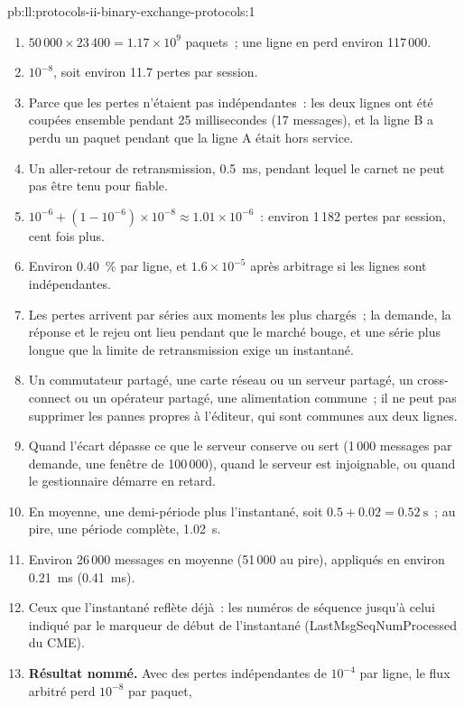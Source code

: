 \begin{solution}{pb:ll:protocols-ii-binary-exchange-protocols:1}
\begin{enumerate}
\item $50\,000 \times 23\,400 = 1.17 \times 10^9$ paquets~; une ligne en perd environ 117\,000.
\item $10^{-8}$, soit environ 11.7 pertes par session.
\item Parce que les pertes n'étaient pas indépendantes~: les deux lignes ont été coupées ensemble pendant 25 millisecondes (17 messages), et la ligne B a perdu un
paquet pendant que la ligne A était hors service.
\item Un aller-retour de retransmission, \qty{0.5}{\milli\second}, pendant lequel le carnet ne peut pas être tenu pour fiable.
\item $10^{-6} + (1 - 10^{-6}) \times 10^{-8} \approx 1.01 \times 10^{-6}$~: environ 1\,182 pertes par session, cent fois plus.
\item Environ 0.40~\% par ligne, et $1.6 \times 10^{-5}$ après arbitrage si les lignes sont indépendantes.
\item Les pertes arrivent par séries aux moments les plus chargés~; la demande, la réponse et le rejeu ont lieu pendant que le marché bouge, et une
série plus longue que la limite de retransmission exige un instantané.
\item Un commutateur partagé, une carte réseau ou un serveur partagé, un cross-connect ou un opérateur partagé, une alimentation commune~; il ne peut pas supprimer les
pannes propres à l'éditeur, qui sont communes aux deux lignes.
\item Quand l'écart dépasse ce que le serveur conserve ou sert (1\,000 messages par demande, une fenêtre de 100\,000), quand le
serveur est injoignable, ou quand le gestionnaire démarre en retard.
\item En moyenne, une demi-période plus l'instantané, soit $0.5 + 0.02 = \qty{0.52}{\second}$~; au pire, une période complète,
\qty{1.02}{\second}.
\item Environ 26\,000 messages en moyenne (51\,000 au pire), appliqués en environ \qty{0.21}{\milli\second} (\qty{0.41}{\milli\second}).
\item Ceux que l'instantané reflète déjà~: les numéros de séquence jusqu'à celui indiqué par le marqueur de début de l'instantané
(LastMsgSeqNumProcessed du CME).
\item \textbf{Résultat nommé.} Avec des pertes indépendantes de $10^{-4}$ par ligne, le flux arbitré perd $10^{-8}$ par paquet,

\end{enumerate}
\end{solution}

